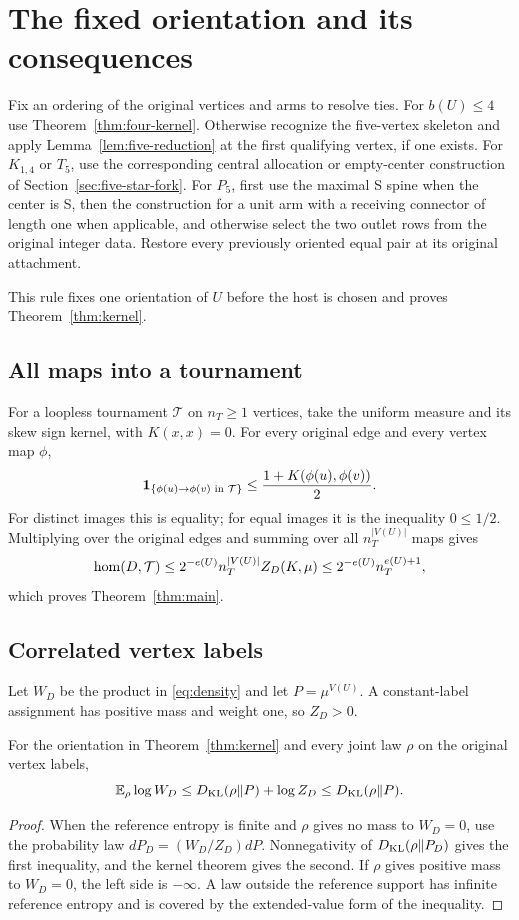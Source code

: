 \section{The fixed orientation and its consequences}\label{sec:completion}
Fix an ordering of the original vertices and arms to resolve ties.
For $b(U)\le4$ use Theorem~\ref{thm:four-kernel}. Otherwise recognize
the five-vertex skeleton and apply Lemma~\ref{lem:five-reduction} at
the first qualifying vertex, if one exists. For $K_{1,4}$ or $T_5$,
use the corresponding central allocation or empty-center construction
of Section~\ref{sec:five-star-fork}. For $P_5$, first use the maximal
S spine when the center is S, then the construction for a unit arm
with a receiving connector of length one when applicable, and otherwise select the two outlet
rows from the original integer data. Restore every previously
oriented equal pair at its original attachment.

This rule fixes one orientation of $U$ before the host is chosen and
proves Theorem~\ref{thm:kernel}.

\subsection{All maps into a tournament}\label{sec:finite-transfer}
For a loopless tournament $\mathcal T$ on $n_T\ge1$ vertices, take
the uniform measure and its skew sign kernel, with $K(x,x)=0$.
For every original edge and every vertex map $\phi$,
\[
 \mathbf1_{\{\phi(u)\to\phi(v)\text{ in }\mathcal T\}}
 \le\frac{1+K(\phi(u),\phi(v))}{2}.
\]
For distinct images this is equality; for equal images it is the
inequality $0\le1/2$. Multiplying over the original edges and summing over all
$n_T^{|V(U)|}$ maps gives
\[
 \operatorname{hom}(D,\mathcal T)\le
  2^{-e(U)}n_T^{|V(U)|}Z_D(K,\mu)
  \le2^{-e(U)}n_T^{e(U)+1},
\]
which proves Theorem~\ref{thm:main}.

\subsection{Correlated vertex labels}
Let $W_D$ be the product in \eqref{eq:density} and let
$P=\mu^{V(U)}$. A constant-label assignment has positive mass and
weight one, so $Z_D>0$.
\begin{corollary}\label{cor:entropy}
For the orientation in Theorem~\ref{thm:kernel} and every joint law
$\rho$ on the original vertex labels,
\[
 \mathbb E_\rho\log W_D
 \le D_{\rm KL}(\rho\Vert P)+\log Z_D
 \le D_{\rm KL}(\rho\Vert P).
\]
\end{corollary}
\begin{proof}
When the reference entropy is finite and $\rho$ gives no mass to
$W_D=0$, use the probability law $dP_D=(W_D/Z_D)dP$. Nonnegativity
of $D_{\rm KL}(\rho\Vert P_D)$ gives the first inequality, and the
kernel theorem gives the second. If $\rho$ gives positive mass to
$W_D=0$, the left side is $-\infty$. A law outside the reference support
has infinite reference entropy and is covered by the extended-value form
of the inequality.
\end{proof}
